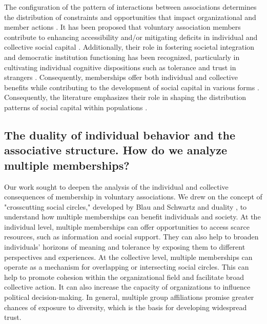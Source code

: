 The configuration of the pattern of interactions between associations determines the distribution of constraints and opportunities that impact organizational and member actions \parencite{kenis_how_2002,paxton_association_2007,son_social_2008,tindall_network_2012}. It has been proposed that voluntary association members contribute to enhancing accessibility and/or mitigating deficits in individual and collective social capital \parencite{benton_uniters_2016,small_villa_2004,son_social_2008, tindall_network_2012, diani_social_1997}. Additionally, their role in fostering societal integration and democratic institution functioning has been recognized, particularly in cultivating individual cognitive dispositions such as tolerance and trust in strangers \parencite{cote_untangling_2009, cote_social_2015,tocqueville_democracy_1980}. Consequently, memberships offer both individual and collective benefits while contributing to the development of social capital in various forms \parencite{moody_building_2009}. Consequently, the literature emphasizes their role in shaping the distribution patterns of social capital within populations \parencite{benton_uniters_2016,diani_social_1997,feld_focused_1981,glanville_voluntary_2004,son_social_2008,tindall_network_2012}.
\bigskip


\subsection{The duality of individual behavior and the associative structure. How do we analyze multiple memberships?}

Our work sought to deepen the analysis of the individual and collective consequences of membership in voluntary associations. We drew on the concept of "crosscutting social circles," developed by Blau and Schwartz \parencite*{blau_crosscutting_1997} and duality \parencite{breiger_duality_1974}, to understand how multiple memberships can benefit individuals and society. At the individual level, multiple memberships can offer opportunities to access scarce resources, such as information and social support. They can also help to broaden individuals' horizons of meaning and tolerance by exposing them to different perspectives and experiences. At the collective level, multiple memberships can operate as a mechanism for overlapping or intersecting social circles. This can help to promote cohesion within the organizational field and facilitate broad collective action. It can also increase the capacity of organizations to influence political decision-making. In general, multiple group affiliations promise greater chances of exposure to diversity, which is the basis for developing widespread trust.
\bigskip

